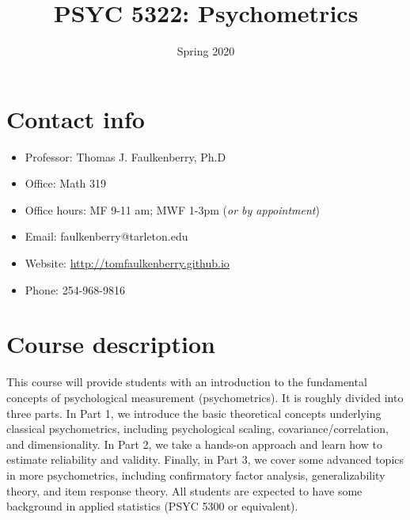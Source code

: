 \documentclass[10pt]{article}
\date{Spring 2020}
\title{PSYC 5322: Psychometrics}
\begin{document}
\maketitle

\section*{Contact info}
\label{sec:org3c9ec88}
\begin{itemize}
\item Professor: Thomas J. Faulkenberry, Ph.D
\item Office: Math 319
\item Office hours: MF 9-11 am; MWF 1-3pm (\emph{or by appointment})
\item Email: faulkenberry@tarleton.edu
\item Website: \url{http://tomfaulkenberry.github.io}
\item Phone: 254-968-9816
\end{itemize}

\section*{Course description}
\label{sec:org0fa5b60}

This course will provide students with an introduction to the fundamental concepts of psychological measurement (psychometrics). It is roughly divided into three parts. In Part 1, we introduce the basic theoretical concepts underlying classical psychometrics, including psychological scaling, covariance/correlation, and dimensionality. In Part 2, we take a hands-on approach and learn how to estimate reliability and validity. Finally, in Part 3, we cover some advanced topics in more psychometrics, including confirmatory factor analysis, generalizability theory, and item response theory. All students are expected to have some background in applied statistics (PSYC 5300 or equivalent). 
\end{document}
